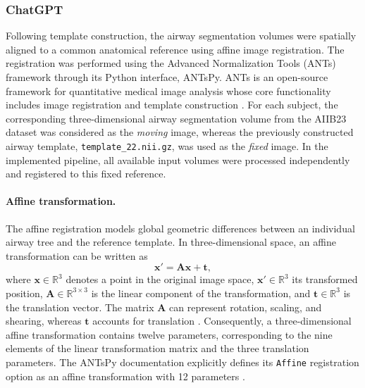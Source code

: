 
\subsubsection{ChatGPT}          %
\label{sec:affine_chatgpt}       %

Following template construction, the airway segmentation volumes were spatially
aligned to a common anatomical reference using affine image registration. The
registration was performed using the Advanced Normalization Tools (ANTs)
framework through its Python interface, ANTsPy. ANTs is an open-source
framework for quantitative medical image analysis whose core functionality
includes image registration and template construction
\cite{avants2009ants,tustison2021antsx}. For each subject, the corresponding
three-dimensional airway segmentation volume from the AIIB23 dataset was
considered as the \emph{moving} image, whereas the previously constructed
airway template, \texttt{template\_22.nii.gz}, was used as the \emph{fixed}
image. In the implemented pipeline, all available input volumes were processed
independently and registered to this fixed reference.

\paragraph{Affine transformation.}  %

The affine registration models global geometric differences between an
individual airway tree and the reference template. In three-dimensional
space, an affine transformation can be written as
\begin{equation}
  \mathbf{x}' = \mathbf{A}\mathbf{x} + \mathbf{t},
  \label{eq:affine_transform}    %
\end{equation}
where $\mathbf{x} \in \mathbb{R}^{3}$ denotes a point in the original image
space, $\mathbf{x}' \in \mathbb{R}^{3}$ its transformed position,
$\mathbf{A} \in \mathbb{R}^{3\times3}$ is the linear component of the
transformation, and $\mathbf{t} \in \mathbb{R}^{3}$ is the translation
vector. The matrix $\mathbf{A}$ can represent rotation, scaling, and shearing,
whereas $\mathbf{t}$ accounts for translation
\cite{itk_software_guide}. Consequently, a three-dimensional affine
transformation contains twelve parameters, corresponding to the nine elements
of the linear transformation matrix and the three translation parameters. The
ANTsPy documentation explicitly defines its \texttt{Affine} registration
option as an affine transformation with 12 parameters
\cite{antspy_registration}.

